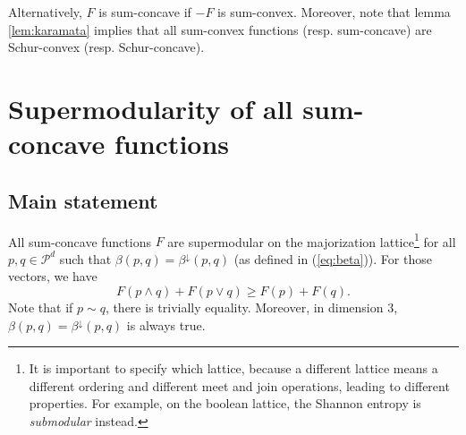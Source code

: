 \noindent Alternatively, $F$ is sum-concave if $-F$ is sum-convex. Moreover, note that lemma \ref{lem:karamata} implies that all sum-convex functions (resp. sum-concave) are Schur-convex (resp. Schur-concave).



\section{Supermodularity of all sum-concave functions} \label{sec:alternative_supermodularity}

\subsection{Main statement}

\begin{theorem} \label{th:alternative_supermodularity}
    All sum-concave functions $F$ are supermodular on the majorization lattice\footnote{It is important to specify which lattice, because a different lattice means a different ordering and different meet and join operations, leading to different properties. For example, on the boolean lattice, the Shannon entropy is \textit{submodular} instead.} for all $p, q \in \mathcal{P}^d$ such that $\beta(p, q) = \beta^\downarrow(p, q)$ (as defined in (\ref{eq:beta})). For those vectors, we have
    \begin{equation} \label{eq:supermodularity}
        F(p \wedge q) + F(p \vee q) \geq F(p) + F(q).
    \end{equation}
    Note that if $p \sim q$, there is trivially equality. Moreover, in dimension 3, $\beta(p, q) = \beta^\downarrow(p, q)$ is always true.
\end{theorem}

